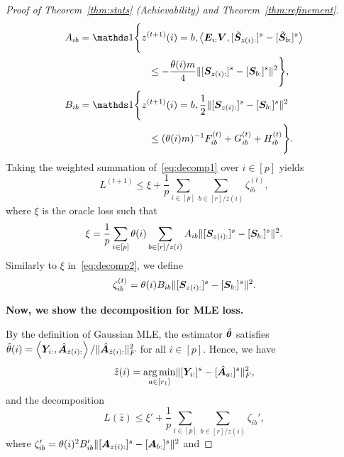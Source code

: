 \documentclass[journal]{IEEEtran}
\theoremstyle{definition}
\theoremstyle{definition}
\newcommand{\ang}[1]{\left\langle#1\right\rangle}
\begin{document}
\begin{proof}[Proof of Theorem~\ref{thm:stats} (Achievability) and Theorem~\ref{thm:refinement}]
    \vspace{-0.5cm}
    \small
    \begin{align}
        A_{ib} &= \ind \Bigg\{z^{(t+1)}(i) = b, \ang{ \mE_{i:} \mV, [  \tilde \mS_{z(i):} ]^s - [  \tilde \mS_{b:} ]^s }  \\
        & \quad \quad \quad \quad \quad \quad \quad \leq - \frac{\theta(i) m}{4} \onormSize{}{ [ \mS_{z(i):}  ]^s - [ \mS_{b:}  ]^s  }^2 \Bigg\},\\
        B_{ib} &= \ind \Bigg\{z^{(t+1)}(i) = b, \frac{1}{2}\onormSize{}{ [ \mS_{z(i):}  ]^s - [ \mS_{b:}  ]^s  }^2 \\
        & \quad \quad \quad \quad \quad \quad \quad  \leq (\theta(i) m)^{-1} F_{ib}^{(t)} + G_{ib}^{(t)} + H_{ib}^{(t)} \Bigg\}.
    \end{align}
    \normalsize
 Taking the weighted summation of~\eqref{eq:decomp1} over $i \in [p]$ yields 
    \begin{equation}
        L^{(t+1)} \leq \xi + \frac{1}{p}\sum_{i \in [p] }  \sum_{b \in [r]/z(i)}  \zeta_{ib}^{(t)}, 
    \end{equation}
    where $\xi$ is the oracle loss such that 
    \begin{equation}\label{eq:decomp2}
        \xi =   \frac{1}{p} \sum_{i \in [p] } \theta(i) \sum_{b \in [r]/z(i)} A_{ib} \onormSize{}{ [ \mS_{ z(i):}  ]^s - [ \mS_{b:}  ]^s  }^2.
    \end{equation}
    Similarly to $\xi$ in~\eqref{eq:decomp2}, we define
    \begin{equation}
        \zeta_{ib}^{(t)} =   \theta(i) B_{ib} \lVert [ \bm S_{ z(i):}  ]^s - [ \bm S_{b:}  ]^s  \rVert^2.
    \end{equation}
    
    {
      
    
    \textbf{Now, we show the decomposition for MLE loss.}
     
    By the definition of Gaussian MLE, the estimator $\hat {\boldsymbol{\theta}}$ satisfies $\hat \theta(i)  = \ang{ \mY_{i:} , \hat \mA_{\hat z(i):} }/{\onormSize{}{ \hat \mA_{\hat z(i):}}_F^2}$ for all $i \in [p]$.
Hence, we have 
\begin{equation}
    \hat z(i) = \operatorname*{arg\,min}_{a \in [r_1]} \lVert [\bm Y_{ i:}]^s - [\hat {\bm A}_{a:}]^s\rVert_F^2,
\end{equation}
and the decomposition 
 \begin{equation}
        L(\hat z) \leq \xi' + \frac{1}{p}\sum_{i \in [p] }  \sum_{b \in [r]/z(i)}  \zeta_{ib}', 
    \end{equation}
    where $ \zeta_{ib}' =   \theta(i)^2 B_{ib}' \lVert [ \bm A_{ z(i):}  ]^s - [ \bm A_{b:}  ]^s  \rVert^2$ and 

}
\end{proof}
\end{document}
